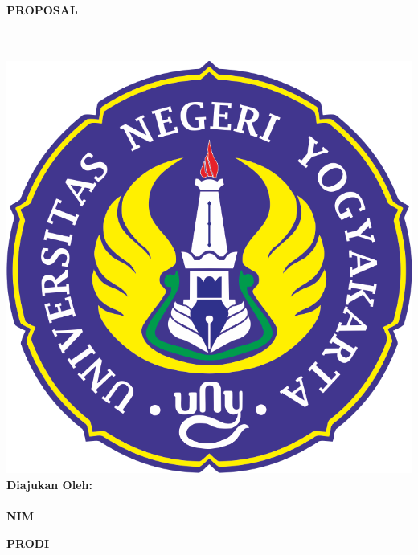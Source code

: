 

\begin{titlepage}
    \begin{center}

        \begin{doublespace}
            \textbf{\Large{\MakeUppercase{Proposal \tipe}}}\\[1cm]
            \textbf{\MakeUppercase{\large{\perusahaan}}}\\[0.1cm]
        \end{doublespace}
        {\alamatperusahaan}\\[3cm]

        \includegraphics[width=0.35\linewidth]{gambar/logo-uny.png}\\[2cm]

        \textbf{Diajukan Oleh:} \\
        \textbf{\MakeUppercase{{\penulis}}} \\
        \textbf{NIM} \textbf{{\nim}}\\[2cm]

        \vfill

        \textbf{\large \MakeUppercase{Prodi \prodi}}\\
        \textbf{\large \MakeUppercase{\fakultas}}\\
        \textbf{\large \MakeUppercase{\universitas}}\\
        \textbf{\large \the\year{}}\\
    \end{center}
\end{titlepage}

